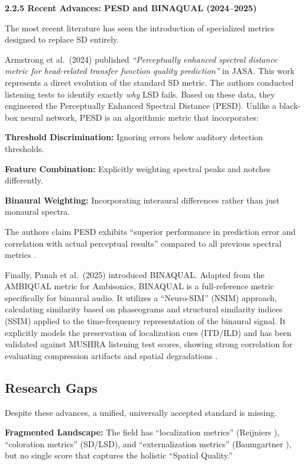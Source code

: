 \documentclass[12pt,a4paper]{article}
\begin{document}
\textbf{2.2.5 Recent Advances: PESD and BINAQUAL (2024--2025)}

The most recent literature has seen the introduction of specialized metrics designed to replace SD entirely.

Armstrong et al.\ (2024) \cite{armstrong2024} published \textit{``Perceptually enhanced spectral distance metric for head-related transfer function quality prediction''} in JASA. This work represents a direct evolution of the standard SD metric. The authors conducted listening tests to identify exactly \textit{why} LSD fails. Based on these data, they engineered the Perceptually Enhanced Spectral Distance (PESD). Unlike a black-box neural network, PESD is an algorithmic metric that incorporates:

\textbf{Threshold Discrimination:} Ignoring errors below auditory detection thresholds.

\textbf{Feature Combination:} Explicitly weighting spectral peaks and notches differently.

\textbf{Binaural Weighting:} Incorporating interaural differences rather than just monaural spectra.

The authors claim PESD exhibits ``superior performance in prediction error and correlation with actual perceptual results'' compared to all previous spectral metrics \cite{armstrong2024}.

Finally, Panah et al.\ (2025) \cite{panah2025} introduced BINAQUAL. Adapted from the AMBIQUAL metric for Ambisonics, BINAQUAL is a full-reference metric specifically for binaural audio. It utilizes a ``Neuro-SIM'' (NSIM) approach, calculating similarity based on phaseograms and structural similarity indices (SSIM) applied to the time-frequency representation of the binaural signal. It explicitly models the preservation of localization cues (ITD/ILD) and has been validated against MUSHRA listening test scores, showing strong correlation for evaluating compression artifacts and spatial degradations \cite{panah2025}.

\subsection{Research Gaps}

Despite these advances, a unified, universally accepted standard is missing.

\textbf{Fragmented Landscape:} The field has ``localization metrics'' (Reijniers \cite{reijniers2014}), ``coloration metrics'' (SD/LSD), and ``externalization metrics'' (Baumgartner \cite{baumgartner2021}), but no single score that captures the holistic ``Spatial Quality.''
\end{document}
